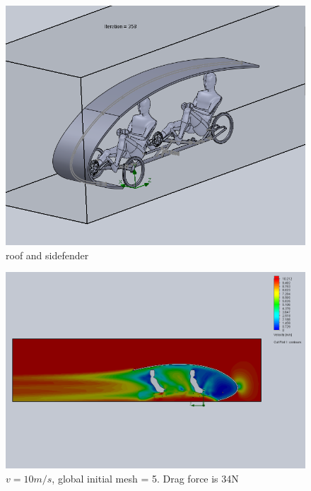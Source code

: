 \documentclass[11pt]{article}
\begin{document}
\begin{figure}[ht]
  \includegraphics[width=\textwidth]{roof2.png}
  \caption{roof and sidefender}
\end{figure}

\begin{figure}[ht]
\includegraphics[width=\textwidth]{gm_5_rf_7_v10_roof2.png}
\caption{$v = 10 m/s$, global initial mesh = 5. Drag force is 34N}
\end{figure}
\end{document}

